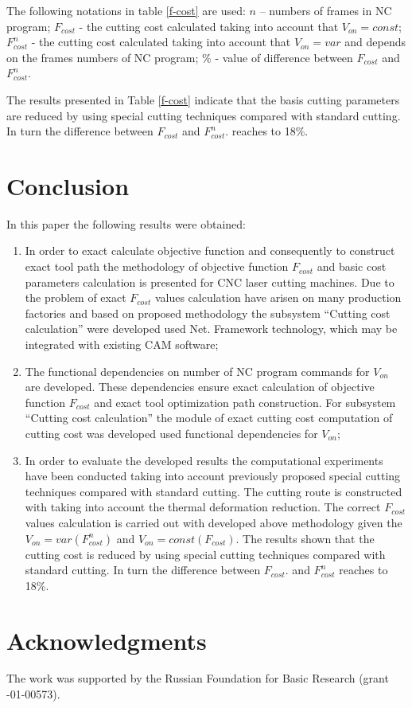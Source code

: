\documentclass[runningheads]{llncs}
\begin{document}
The following notations in table \ref{f-cost}
are used:
$n$ – numbers of frames in NC program;
$F_{cost}$ - the cutting cost calculated taking into account that $V_{on}=const$;
$F^n_{cost}$ - the cutting cost calculated taking into account that $V_{on}=var$
and depends on the frames numbers of NC program;
\% - value of difference between
$F_{cost}$
and
$F^n_{cost}$.

The results presented in Table \ref{f-cost} indicate that
the basis cutting parameters are reduced by using special cutting techniques
compared with standard cutting.
In turn the difference between
$F_{cost}$
and
$F^n_{cost}$.
reaches to 18\%.

\section{Conclusion}

In this paper the following results were obtained:

\begin{enumerate}

\item
In order to exact calculate objective function and consequently
to construct exact tool path the methodology of objective function
$F_{cost}$
and basic cost parameters calculation
is presented for CNC laser cutting machines.
Due to the problem of exact
$F_{cost}$
values calculation have arisen on many production factories
and based on proposed methodology the subsystem
``Cutting cost calculation''
were developed used Net. Framework technology,
which may be integrated with existing CAM software;

\item
The functional dependencies on number of NC program commands for
$V_{on}$
are developed.
These dependencies ensure exact calculation
of objective function
$F_{cost}$
and exact tool optimization path construction.
For subsystem ``Cutting cost calculation''
the module of exact cutting cost computation
of cutting cost was developed used functional dependencies for
$V_{on}$;

\item
In order to evaluate the developed results
the computational experiments have been conducted
taking into account previously proposed
special cutting techniques compared with standard cutting.
The cutting route is constructed
with taking into account the thermal deformation reduction.
The correct
$F_{cost}$
values calculation is carried out
with developed above methodology given the
$V_{on} = var(F_{cost}^n)$
and
$V_{on} = const(F_{cost})$.
The results shown that
the cutting cost is reduced by using special cutting techniques
compared with standard cutting.
In turn the difference between
$F_{cost}$.
and
$F_{cost}^n$
reaches to 18\%.

\end{enumerate}

\section{Acknowledgments}
The work was supported by the Russian Foundation for Basic Research
(grant -01-00573).



\end{document}
